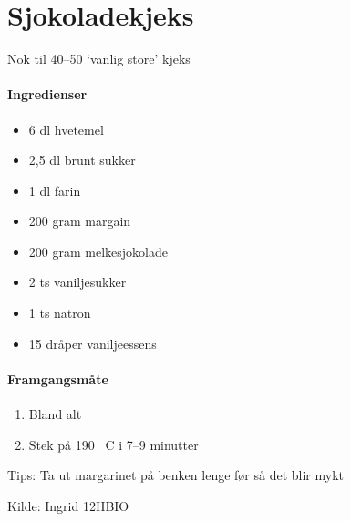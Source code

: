 \section{Sjokoladekjeks}
Nok til 40--50 `vanlig store' kjeks

\paragraph{Ingredienser}
\begin{itemize}[noitemsep]
  \item 6 dl hvetemel
  \item 2,5 dl brunt sukker
  \item 1 dl farin
  \item 200 gram margain
  \item 200 gram melkesjokolade
  \item 2 ts vaniljesukker
  \item 1 ts natron
  \item 15 dråper vaniljeessens
\end{itemize}

\paragraph{Framgangsmåte}
\begin{enumerate}[noitemsep]
  \item Bland alt
  \item Stek på 190 \degree~C i 7--9 minutter
\end{enumerate}

Tips: Ta ut margarinet på benken lenge før så det blir mykt

Kilde: Ingrid 12HBIO
